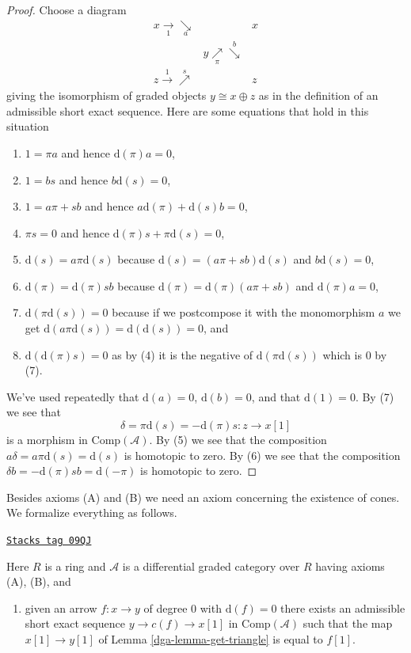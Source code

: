 \begin{proof}
Choose a diagram
$$
\begin{array}{ccc}x \underset{1}{\longrightarrow}\underset{a}{\searrow} &  & x \\  & y \underset{\pi}{\nearrow}\overset{b}{\searrow} &  \\ z \overset{1}{\longrightarrow}\overset{s}{\nearrow} &  & z\end{array}
$$
giving the isomorphism of graded objects $y \cong x \oplus z$ as in the
definition of an admissible short exact sequence. Here are some equations
that hold in this situation
\begin{enumerate}
\item $1 = \pi a$ and hence $\text{d}(\pi) a = 0$,
\item $1 = b s$ and hence $b \text{d}(s) = 0$,
\item $1 = a \pi + s b$ and hence $a \text{d}(\pi) + \text{d}(s) b = 0$,
\item $\pi s = 0$ and hence $\text{d}(\pi)s + \pi \text{d}(s) = 0$,
\item $\text{d}(s) = a \pi \text{d}(s)$ because
$\text{d}(s) = (a \pi + s b)\text{d}(s)$ and $b\text{d}(s) = 0$,
\item $\text{d}(\pi) = \text{d}(\pi) s b$ because
$\text{d}(\pi) = \text{d}(\pi)(a \pi + s b)$ and $\text{d}(\pi)a = 0$,
\item $\text{d}(\pi \text{d}(s)) = 0$ because if we postcompose it
with the monomorphism $a$ we get
$\text{d}(a\pi \text{d}(s)) = \text{d}(\text{d}(s)) = 0$, and
\item $\text{d}(\text{d}(\pi)s) = 0$ as by (4) it is the negative
of $\text{d}(\pi\text{d}(s))$ which is $0$ by (7).
\end{enumerate}
We've used repeatedly that $\text{d}(a) = 0$, $\text{d}(b) = 0$,
and that $\text{d}(1) = 0$. By (7) we see that
$$
\delta = \pi \text{d}(s) = - \text{d}(\pi) s : z \to x[1]
$$
is a morphism in $\text{Comp}(\mathcal{A})$. By (5) we see that
the composition $a \delta = a \pi \text{d}(s) = \text{d}(s)$
is homotopic to zero. By (6) we see that the composition
$\delta b = - \text{d}(\pi)sb = \text{d}(-\pi)$ is homotopic to zero.
\end{proof}

Besides axioms (A) and (B) we need an axiom concerning the existence of
cones. We formalize everything as follows.

\begin{definition}
\label{dga-situation-ABC}
\href{https://stacks.math.columbia.edu/tag/09QJ}{\texttt{Stacks tag 09QJ}}

Here $R$ is a ring and $\mathcal{A}$ is a differential graded category
over $R$ having axioms (A), (B), and
\begin{enumerate}
\item[(C)] given an arrow $f : x \to y$ of degree $0$ with
$\text{d}(f) = 0$ there exists an admissible short exact sequence
$y \to c(f) \to x[1]$ in $\text{Comp}(\mathcal{A})$ such that the map
$x[1] \to y[1]$ of Lemma \ref{dga-lemma-get-triangle} is equal to $f[1]$.
\end{enumerate}
\end{definition}

